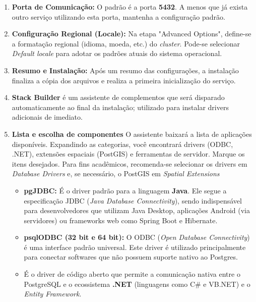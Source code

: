 \begin{enumerate}
    \item \textbf{Porta de Comunicação:} O padrão é a porta \textbf{5432}. A menos que já exista outro serviço utilizando esta porta, mantenha a configuração padrão.
    
    \item \textbf{Configuração Regional (Locale):} Na etapa "Advanced Options", define-se a formatação regional (idioma, moeda, etc.) do \textit{cluster}. Pode-se selecionar \textit{Default locale} para adotar os padrões atuais do sistema operacional.

    \item \textbf{Resumo e Instalação:} Após um resumo das configurações, a instalação finaliza a cópia dos arquivos e realiza a primeira inicialização do serviço.

    \item \textbf{Stack Builder} é um assistente de complementos que será disparado automaticamente ao final da instalação; utilizado para instalar drivers adicionais de imediato.
    
    \item \textbf{Lista e escolha de componentes} O assistente baixará a lista de aplicações disponíveis. Expandindo as categorias, você encontrará drivers (ODBC, .NET), extensões espaciais (PostGIS) e ferramentas de servidor. Marque os itens desejados. Para fins acadêmicos, recomenda-se selecionar os drivers em \textit{Database Drivers} e, se necessário, o PostGIS em \textit{Spatial Extensions}

    \begin{itemize}
        \item \textbf{pgJDBC:} É o driver padrão para a linguagem \textbf{Java}. Ele segue a especificação JDBC (\textit{Java Database Connectivity}), sendo indispensável para desenvolvedores que utilizam Java Desktop, aplicações Android (via servidores) ou frameworks web como Spring Boot e Hibernate.

        \item \textbf{psqlODBC (32 bit e 64 bit):} O ODBC (\textit{Open Database Connectivity}) é uma interface padrão universal. Este driver é utilizado principalmente para conectar softwares que não possuem suporte nativo ao Postgres. 
        
        \item[Npgsql:] É o driver de código aberto que permite a comunicação nativa entre o PostgreSQL e o ecossistema \textbf{.NET} (linguagens como C\# e VB.NET) e o \textit{Entity Framework}.
  

\end{itemize}
\end{enumerate}
